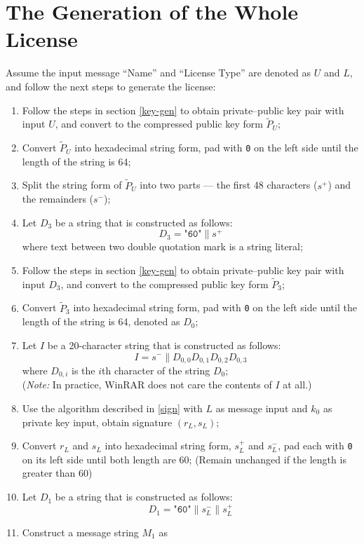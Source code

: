 \documentclass[oneside]{article}
\begin{document}
\section{The Generation of the Whole License}
Assume the input message ``Name'' and ``License Type'' are denoted as $U$ and $L$, and follow the next steps to generate the license:
\begin{enumerate}
      \item Follow the steps in section \ref{key-gen} to obtain private--public key pair with input $U$, and convert to the compressed public key form $\tilde{P}_U$;
      \item Convert $\tilde{P}_U$ into hexadecimal string form, pad with \texttt{0} on the left side until the length of the string is 64;
      \item Split the string form of $\tilde{P}_U$ into two parts --- the first 48 characters ($s^+$) and the remainders ($s^-$);
      \item Let $D_3$ be a string that is constructed as follows:
            \[D_3=\texttt{"60"}\parallel s^+\]
            where text between two double quotation mark is a string literal;
      \item Follow the steps in section \ref{key-gen} to obtain private--public key pair with input $D_3$, and convert to the compressed public key form $\tilde{P}_3$;
      \item Convert $\tilde{P}_3$ into hexadecimal string form, pad with \texttt{0} on the left side until the length of the string is 64, denoted as $D_0$;
      \item Let $I$ be a 20-character string that is constructed as follows:
            \[I=s^-\parallel D_{0,0}D_{0,1}D_{0,2}D_{0,3}\]
            where $D_{0,i}$ is the $i$th character of the string $D_0$;\\
            (\emph{Note:} In practice, WinRAR does not care the contents of $I$ at all.)
      \item Use the algorithm described in \ref{sign} with $L$ as message input and $k_0$ as private key input, obtain signature $\left(r_L,s_L\right)$;
      \item Convert $r_L$ and $s_L$ into hexadecimal string form, $s_L^+$ and $s_L^-$, pad each with \texttt{0} on its left side until both length are 60; (Remain unchanged if the length is greater than 60)
      \item Let $D_1$ be a string that is constructed as follows:
            \[D_1=\texttt{"60"}\parallel s_L^-\parallel s_L^+\]
      \item Construct a message string $M_1$ as

\end{enumerate}
\end{document}
